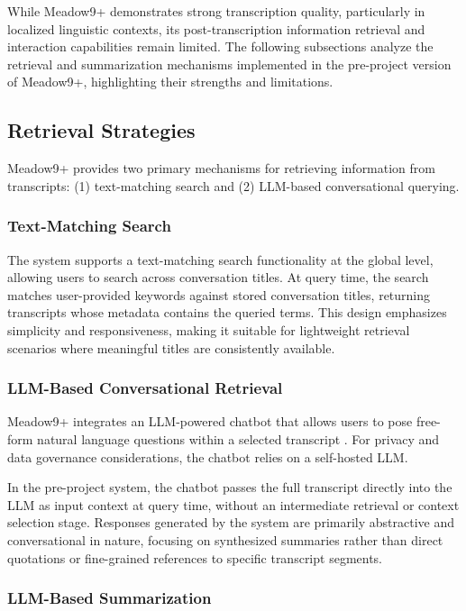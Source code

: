 While Meadow9+ demonstrates strong transcription quality, particularly in localized linguistic contexts, its post-transcription information retrieval and interaction capabilities remain limited. The following subsections analyze the retrieval and summarization mechanisms implemented in the pre-project version of Meadow9+, highlighting their strengths and limitations.

\subsection{Retrieval Strategies}
Meadow9+ provides two primary mechanisms for retrieving information from transcripts: (1) text-matching search and (2) LLM-based conversational querying.

\subsubsection{Text-Matching Search}

The system supports a text-matching search functionality at the global level, allowing users to search across conversation titles. At query time, the search matches user-provided keywords against stored conversation titles, returning transcripts whose metadata contains the queried terms. This design emphasizes simplicity and responsiveness, making it suitable for lightweight retrieval scenarios where meaningful titles are consistently available.

\subsubsection{LLM-Based Conversational Retrieval}

Meadow9+ integrates an LLM-powered chatbot that allows users to pose free-form natural language questions within a selected transcript \cite{meadow9_appstore_us}. For privacy and data governance considerations, the chatbot relies on a self-hosted LLM. 

In the pre-project system, the chatbot passes the full transcript directly into the LLM as input context at query time, without an intermediate retrieval or context selection stage. Responses generated by the system are primarily abstractive and conversational in nature, focusing on synthesized summaries rather than direct quotations or fine-grained references to specific transcript segments.

\subsubsection{LLM-Based Summarization}

